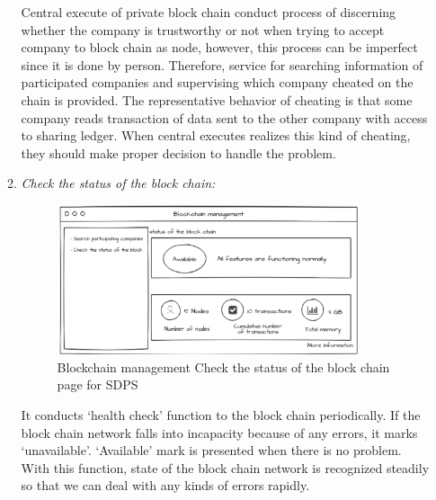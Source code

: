 \documentclass[conference]{IEEEtran}
\begin{document}
\begin{enumerate}
\begin{enumerate}
	Central execute of private block chain conduct process of discerning whether the company is trustworthy or not when trying to accept company to block chain as node, however, this process can be imperfect since it is done by person. Therefore, service for searching information of participated companies and supervising which company cheated on the chain is provided. The representative behavior of cheating is that some company reads transaction of data sent to the other company with access to sharing ledger. When central executes realizes this kind of cheating, they should make proper decision to handle the problem.\\
        \item \textit{Check the status of the block chain:} 
        \begin{figure}[htbp]
	\centerline{\includegraphics[width=89mm,scale=0.5]{school/blockchain_management2.png}}
	\caption{Blockchain management Check the status of the block chain page for SDPS}
	\label{fig}
	\end{figure}
        
        It conducts ‘health check’ function to the block chain periodically. If the block chain network falls into incapacity because of any errors, it marks ‘unavailable’. ‘Available’ mark is presented when there is no problem. With this function, state of the block chain network is recognized steadily so that we can deal with any kinds of errors rapidly.\\
    \end{enumerate}
\end{enumerate}
\end{document}
